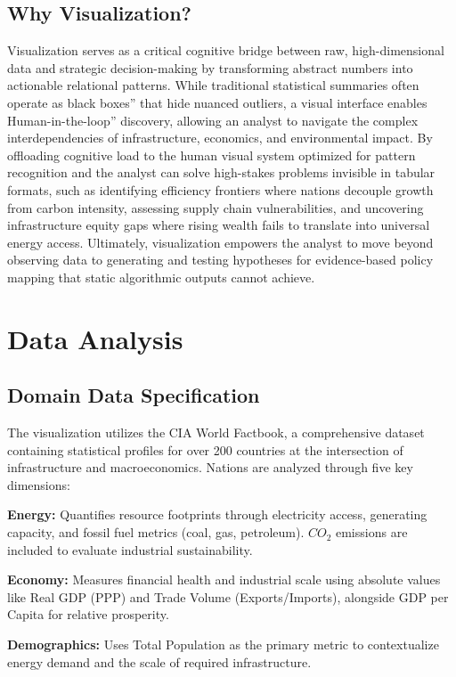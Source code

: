 \documentclass[conference]{IEEEtran}
\begin{document}
\subsection{Why Visualization?}
Visualization serves as a critical cognitive bridge between raw, high-dimensional data and strategic decision-making by transforming abstract numbers into actionable relational patterns. While traditional statistical summaries often operate as black boxes'' that hide nuanced outliers, a visual interface enables Human-in-the-loop'' discovery, allowing an analyst to navigate the complex interdependencies of infrastructure, economics, and environmental impact. By offloading cognitive load to the human visual system optimized for pattern recognition and the analyst can solve high-stakes problems invisible in tabular formats, such as identifying efficiency frontiers where nations decouple growth from carbon intensity, assessing supply chain vulnerabilities, and uncovering infrastructure equity gaps where rising wealth fails to translate into universal energy access. Ultimately, visualization empowers the analyst to move beyond observing data to generating and testing hypotheses for evidence-based policy mapping that static algorithmic outputs cannot achieve.

\section{Data Analysis}

\subsection{Domain Data Specification}
The visualization utilizes the CIA World Factbook, a comprehensive dataset containing statistical profiles for over 200 countries at the intersection of infrastructure and macroeconomics. Nations are analyzed through five key dimensions:

\textbf{Energy:} Quantifies resource footprints through electricity access, generating capacity, and fossil fuel metrics (coal, gas, petroleum). $CO_2$ emissions are included to evaluate industrial sustainability.


\textbf{Economy:} Measures financial health and industrial scale using absolute values like Real GDP (PPP) and Trade Volume (Exports/Imports), alongside GDP per Capita for relative prosperity.


\textbf{Demographics:} Uses Total Population as the primary metric to contextualize energy demand and the scale of required infrastructure.
\end{document}
